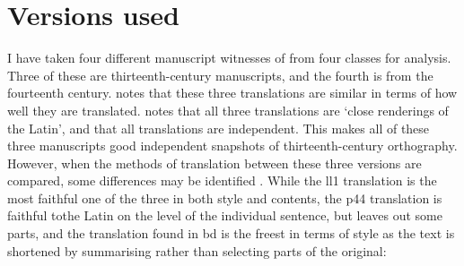 \section{Versions used}
I have taken four different manuscript witnesses of  from four classes for analysis.
Three of these are thirteenth-century manuscripts, and the fourth is from the fourteenth century.
\Textcite{Rob_Testunau74}  notes that these three translations  are similar in terms of how well they are translated.  
\Textcite[xxix]{roberts_brut_1971} notes that all three translations are `close renderings of the Latin', and that all translations are independent.
This makes all of these three  manuscripts good independent snapshots of thirteenth-century orthography.
However, when the methods of translation between these three versions are compared, some differences may be identified \autocite{Rob_Testunau74}.
While the \gls{ll1} translation is the most faithful one of the three in both style and contents, the \gls{p44} translation is faithful tothe Latin on the level of the individual sentence, but leaves out some parts, and the translation found in \gls{bd} is the freest in terms of style as the text is shortened by summarising rather than selecting parts of the original:
